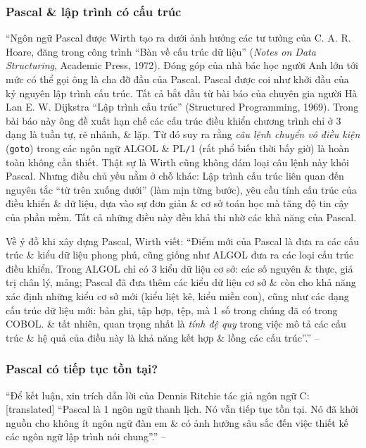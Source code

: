 \documentclass[oneside]{book}
\numberwithin{equation}{section}
\begin{document}
\subsubsection{Pascal \& lập trình có cấu trúc}
``Ngôn ngữ Pascal được Wirth tạo ra dưới ảnh hưởng các tư tưởng của C. A. R. Hoare, đăng trong công trình ``Bàn về cấu trúc dữ liệu'' (\textit{Notes on Data Structuring}, Academic Press, 1972). Đóng góp của nhà bác học người Anh lớn tới mức có thể gọi ông là cha đỡ đầu của Pascal. Pascal được coi như khởi đầu của kỷ nguyên lập trình cấu trúc. Tất cả bắt đầu từ bài báo của chuyên gia người Hà Lan E. W. Dijkstra ``Lập trình cấu trúc'' (Structured Programming, 1969). Trong bài báo này ông đề xuất hạn chế các cấu trúc điều khiển chương trình chỉ ở 3 dạng là tuần tự, rẽ nhánh, \& lặp. Từ đó suy ra rằng \textit{câu lệnh chuyển vô điều kiện} (\texttt{goto}) trong các ngôn ngữ ALGOL \& PL\texttt{/}1 (rất phổ biến thời bấy giờ) là hoàn toàn không cần thiết. Thật sự là Wirth cũng không dám loại câu lệnh này khỏi Pascal. Nhưng điều chủ yếu nằm ở chỗ khác: Lập trình cấu trúc liên quan đến nguyên tắc ``từ trên xuống dưới'' (làm mịn từng bước), yêu cầu tính cấu trúc của điều khiển \& dữ liệu, dựa vào sự đơn giản \& cơ sở toán học mà tăng độ tin cậy của phần mềm. Tất cả những điều này đều khả thi nhờ các khả năng của Pascal.

Về ý đồ khi xây dựng Pascal, Wirth viết: ``Điểm mới của Pascal là đưa ra các cấu trúc \& kiểu dữ liệu phong phú, cũng giống như ALGOL đưa ra các loại cấu trúc điều khiển. Trong ALGOL chỉ có 3 kiểu dữ liệu cơ sở: các số nguyên \& thực, giá trị chân lý, mảng; Pascal đã đưa thêm các kiểu dữ liệu cơ sở \& còn cho khả năng xác định những kiểu cơ sở mới (kiểu liệt kê, kiểu miền con), cũng như các dạng cấu trúc dữ liệu mới: bản ghi, tập hợp, tệp, mà 1 số trong chúng đã có trong COBOL. \& tất nhiên, quan trọng nhất là \textit{tính đệ quy} trong việc mô tả các cấu trúc \& hệ quả của điều này là khả năng kết hợp \& lồng các cấu trúc''.'' -- \cite[p. 15]{SGK_Tin_Hoc_11}

\subsubsection{Pascal có tiếp tục tồn tại?}
``Để kết luận, xin trích dẫn lời của Dennis Ritchie tác giả ngôn ngữ C: [translated] ``Pascal là 1 ngôn ngữ thanh lịch. Nó vẫn tiếp tục tồn tại. Nó đã khởi nguồn cho không ít ngôn ngữ đàn em \& có ảnh hưởng sâu sắc đến việc thiết kế các ngôn ngữ lập trình nói chung''.'' -- \cite[p. 15]{SGK_Tin_Hoc_11}
\end{document}
